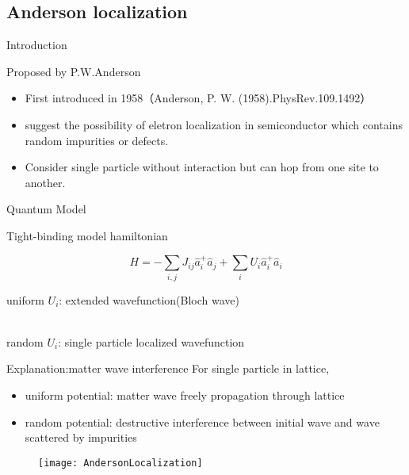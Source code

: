 \documentclass{beamer}
\begin{document}
\subsection{Anderson localization}
\begin{frame}{Introduction}

Proposed by P.W.Anderson 

\begin{itemize}
\item First introduced in 1958（Anderson, P. W. (1958).PhysRev.109.1492）

\item suggest the possibility of eletron localization in semiconductor which contains random impurities or defects.

\item Consider single particle without interaction but can hop from one site to another.

\end{itemize}

\end{frame}

\begin{frame}{Quantum Model}

Tight-binding model hamiltonian

$$H = -\sum_{i,j}J_{ij} \hat{a}^{+}_{i}\hat{a}_{j}+\sum_{i}U_{i}\hat{a}^{+}_{i}\hat{a}_{i}$$

uniform $U_{i}$: extended wavefunction(Bloch wave)\\~


random  $U_{i}$: single particle localized wavefunction

\end{frame}
\begin{frame}{Explanation:matter wave interference}
For single particle in lattice,
\begin{itemize}
\item uniform potential: matter wave freely propagation through lattice
\item random potential: destructive interference between initial wave and wave scattered by impurities
\end{itemize}
\begin{figure}
\texttt{[image: AndersonLocalization]}
\end{figure}
\end{frame}
\end{document}
